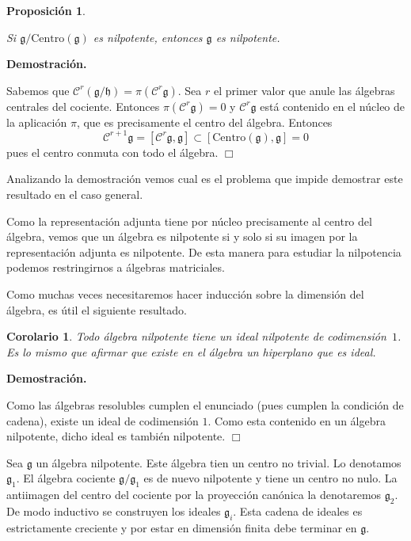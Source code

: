 \documentclass[a4paper,draft,12pt]{article}
\newtheorem{propo}[teo]{Proposición}%
\newtheorem{cor}[teo]{Corolario}%
\newcommand{\dem}{\noindent \textbf{Demostración. }\vspace{0.3 cm}}%
\newcommand{\g}{\mathfrak{g}}%
\newcommand{\fin}{ $\Box $ \vspace{0.4 cm}}
\newcommand{\central}{\mathcal{C}}%
\begin{document}
\begin{propo}\label{propo:centronilpotente}

Si $\g/\mathrm{Centro}(\g)$ es nilpotente, entonces $\g$ es nilpotente.

\end{propo}

\dem

Sabemos que $\central^r(\g/\mathfrak{h})= \pi (\central^r \g)$.  Sea $r$ el primer valor que anule las álgebras centrales del cociente.  Entonces $ \pi (\central^r \g)=0$ y $\central^r\g$ está contenido en el núcleo de la aplicación $\pi$, que es precisamente el centro del álgebra.  Entonces
$$
\central^{r+1}\g = [\central^r \g, \g] \subset [\mathrm{Centro}(\g),\g]=0
$$
pues el centro conmuta con todo el álgebra.  \fin


Analizando la demostración vemos cual es el problema que impide demostrar este resultado en el caso general.

Como la representación adjunta tiene por núcleo precisamente al centro del álgebra, vemos que un álgebra es nilpotente si y solo si su imagen por la representación adjunta es nilpotente.  De esta manera para estudiar la nilpotencia podemos restringirnos a álgebras matriciales.

Como muchas veces necesitaremos hacer inducción sobre la dimensión del álgebra, es útil el siguiente resultado.

\begin{cor}

Todo álgebra nilpotente tiene un ideal nilpotente de codimensión~$1$.  Es lo mismo que afirmar que existe en el álgebra un hiperplano que es ideal.

\end{cor}


\dem

 Como las álgebras resolubles cumplen el enunciado (pues cumplen la condición de cadena), existe un ideal de codimensión $1$.  Como esta contenido en un álgebra nilpotente, dicho ideal es también nilpotente.  \fin

Sea $\g$ un álgebra nilpotente.  Este álgebra tien un centro no trivial.  Lo denotamos $\g_1$.  El álgebra cociente $\g/ \g_1$ es de nuevo nilpotente y tiene un centro no nulo.  La antiimagen del centro del cociente por la proyección canónica la denotaremos $\g_2$.  De modo inductivo se construyen los ideales $\g_i$. Esta cadena de ideales es estrictamente creciente y por estar en dimensión finita debe terminar en $\g$.
\end{document}
